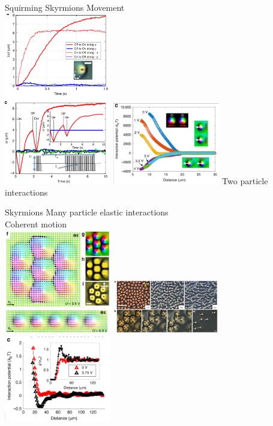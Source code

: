 \documentclass[t, 11pt, xcolor=dvipsnames]{beamer}
\begin{document}
\begin{frame}[plain]{Squirming Skyrmions}
  Movement \\
    \includegraphics[width=0.35\textwidth]{images/squirm.png}
    \includegraphics[width=0.35\textwidth]{images/2part.png}
  Two particle interactions \\
\end{frame}

\begin{frame}[plain]{Skyrmions}
  Many particle elastic interactions \\
  Coherent motion \\
    \includegraphics[width=0.35\textwidth]{images/cluster.png}
    \includegraphics[width=0.35\textwidth]{images/manypart.png}
    \includegraphics[width=0.35\textwidth]{images/LJ.png}
  \hypertarget<1>{slide3}{}
\end{frame}
\end{document}
